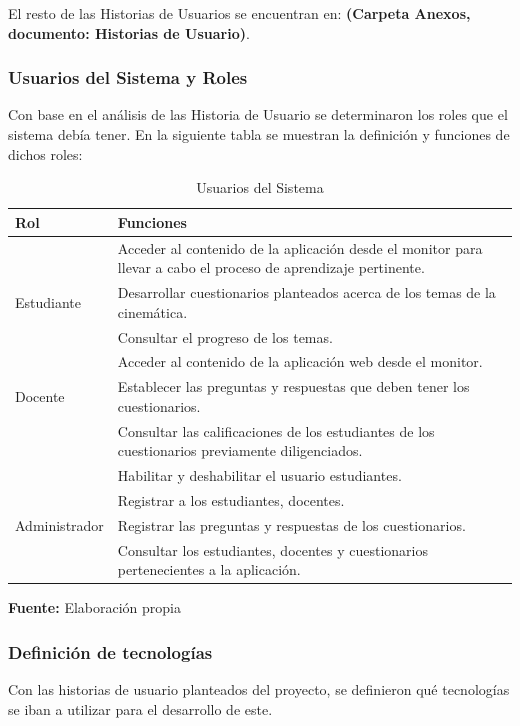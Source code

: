 El resto de las Historias de Usuarios se encuentran en:  \textbf{(Carpeta Anexos, documento: Historias de Usuario)}.

\subsubsection{Usuarios del Sistema y Roles}
Con base en el análisis de las Historia de Usuario se determinaron los roles que el sistema debía tener.  En la siguiente tabla se muestran la definición y funciones de dichos roles:

\begin{table}[H]
    \centering
    \begin{tabular}{|p{3cm}|p{12cm}|}
        \hline
        \textbf{Rol} & \textbf{Funciones} \\
        \hline
        & Acceder al contenido de la aplicación desde el monitor para llevar a cabo el proceso de aprendizaje pertinente. \\
        Estudiante& Desarrollar cuestionarios planteados acerca de los temas de la cinemática.\\
        & Consultar el progreso de los temas.\\
       \hline
        & Acceder al contenido de la aplicación web desde el monitor. \\
        Docente& Establecer las preguntas y respuestas que deben tener los cuestionarios.\\
        & Consultar las calificaciones de los estudiantes de los cuestionarios previamente diligenciados.\\
        & Habilitar y deshabilitar el usuario estudiantes.\\
        \hline
        & Registrar a los estudiantes, docentes. \\
        Administrador& Registrar las preguntas y respuestas de los cuestionarios.\\
        & Consultar los estudiantes, docentes y cuestionarios pertenecientes a la aplicación.\\
       \hline
    \end{tabular}
    \caption{Usuarios del Sistema}
    \centering \scriptsize \textbf{Fuente:} Elaboración propia
    \label{tab:usSis}
\end{table}

\subsubsection{Definición de tecnologías }
Con las historias de usuario planteados del proyecto, se definieron qué tecnologías se iban a utilizar para el desarrollo de este. 


